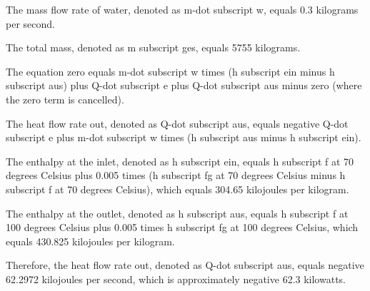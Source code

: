 The mass flow rate of water, denoted as m-dot subscript w, equals 0.3 kilograms per second.

The total mass, denoted as m subscript ges, equals 5755 kilograms.

The equation zero equals m-dot subscript w times (h subscript ein minus h subscript aus) plus Q-dot subscript e plus Q-dot subscript aus minus zero (where the zero term is cancelled).

The heat flow rate out, denoted as Q-dot subscript aus, equals negative Q-dot subscript e plus m-dot subscript w times (h subscript aus minus h subscript ein).

The enthalpy at the inlet, denoted as h subscript ein, equals h subscript f at 70 degrees Celsius plus 0.005 times (h subscript fg at 70 degrees Celsius minus h subscript f at 70 degrees Celsius), which equals 304.65 kilojoules per kilogram.

The enthalpy at the outlet, denoted as h subscript aus, equals h subscript f at 100 degrees Celsius plus 0.005 times h subscript fg at 100 degrees Celsius, which equals 430.825 kilojoules per kilogram.

Therefore, the heat flow rate out, denoted as Q-dot subscript aus, equals negative 62.2972 kilojoules per second, which is approximately negative 62.3 kilowatts.